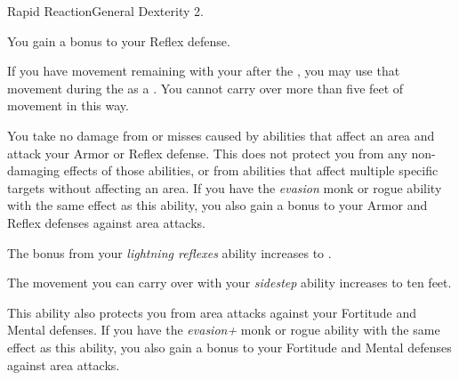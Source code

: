     \begin{feat}{Rapid Reaction}{General}
        \featpre Dexterity 2.

         You gain a  bonus to your Reflex defense.

         If you have movement remaining with your  after the , you may use that movement during the  as a .
        You cannot carry over more than five feet of movement in this way.

         You take no damage from  or misses caused by abilities that affect an area and attack your Armor or Reflex defense.
        This does not protect you from any non-damaging effects of those abilities, or from abilities that affect multiple specific targets without affecting an area.
        If you have the \textit{evasion} monk or rogue ability with the same effect as this ability, you also gain a  bonus to your Armor and Reflex defenses against area attacks.

         The bonus from your \textit{lightning reflexes} ability increases to .

         The movement you can carry over with your \textit{sidestep} ability increases to ten feet.

         This ability also protects you from area attacks against your Fortitude and Mental defenses.
        If you have the \textit{evasion+} monk or rogue ability with the same effect as this ability, you also gain a  bonus to your Fortitude and Mental defenses against area attacks.
    \end{feat}


